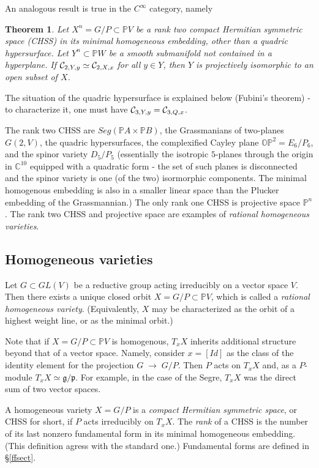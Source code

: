\documentclass[11pt]{amsart}
\newtheorem{theorem}{Theorem}[section]
\theoremstyle{definition}
\theoremstyle{remark}
\numberwithin{equation}{section}
\def\BC{\mathbb C}\def\BF{\mathbb F}\def\BO{\mathbb O}\def\BS{\mathbb S}
\def\BP{\mathbb P}
\def\pp#1{\mathbb P^{#1}}
\def\pp#1{{\mathbb P}^{#1}}
\def\fg{{\mathfrak g}}
\def\fp{{\mathfrak p}}
\def\ra{{\mathord{\;\rightarrow\;}}}
\begin{document}
An analogous result is true in the $C^{\infty}$ category, namely


\begin{theorem}
Let $X^n=G/P\subset \BP V$ be a rank two compact Hermitian symmetric
space (CHSS) in its minimal homogeneous embedding, other than a quadric
hypersurface. Let $Y^n\subset \BP W$ be a smooth submanifold not contained
in a hyperplane.
If ${\mathcal C}_{2,Y,y}\simeq {\mathcal C}_{2,X,x}$  for all $y\in Y$, then $Y$ is projectively isomorphic to
an open subset of $X$.
\end{theorem}


The situation of the quadric hypersurface is explained below
(Fubini's theorem) - to characterize
it, one must have ${\mathcal C}_{3,Y,y}={\mathcal C}_{3,Q,x}$.



The rank two CHSS are $Seg(\BP A\times \BP B)$, the
Grassmanians of two-planes $G(2,V)$, the quadric hypersurfaces, the
complexified Cayley plane
$\BO\BP^2= E_6/P_6$, and the
spinor variety $D_5/P_5$ (essentially the isotropic $5$-planes
through the origin in $\BC^{10}$ equipped with a quadratic form - the set of such planes is disconnected and the spinor variety is
one (of the two) isormorphic components. The minimal homogenous
embedding is also in a smaller linear space than the Plucker
embedding of the Grassmannian.)  The only rank one CHSS is projective space $\pp n$. 
The rank two CHSS and projective space are examples of 
{\it rational homogeneous varieties}.

\subsection{Homogeneous varieties}
Let $G\subset GL(V)$ be a reductive group acting irreducibly
on a vector space $V$. Then there exists a unique
closed orbit $X=G/P\subset \BP V$, which is called
a {\it rational homogeneous variety}.
(Equivalently, $X$ may be characterized as the orbit of a highest weight line,
or as the minimal orbit.)
 

Note that if $X=G/P\subset \BP V$ is homogenous, $T_xX$
inherits additional structure beyond that of a vector space.
Namely, consider $x=[Id]$ as the class of the identity
element for the projection $G\ra G/P$. Then $P$ acts on $T_xX$
and, as a $P$-module $T_xX\simeq \fg/\fp$. For example, in the
case of the Segre, $T_xX$ was the direct sum of two vector spaces.

A homogeneous variety $X=G/P$ is a {\it compact Hermitian symmetric
space}, or CHSS for short, if $P$ acts irreducibly on $T_xX$.
The {\it rank} of a CHSS is the  number of its last nonzero fundamental form
in its minimal homogeneous embedding. (This definition
agress with the standard one.) Fundamental forms are defined in \S\ref{ffsect}.
 
\end{document}
